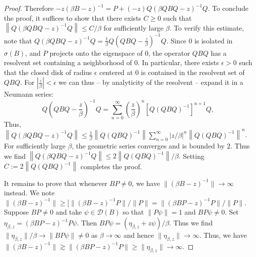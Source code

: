 \documentclass[10pt,a4paper]{amsart}
\begin{document}
\begin{proof}
	Therefore
	$
	-z (\beta B - z)^{-1} = P + (-z) Q (\beta Q B Q - z)^{-1} Q.
	$	
	To conclude the proof, it suffices to show that there exists $C \geq 0$ such that
	$
	\left\| Q (\beta Q B Q - z)^{-1} Q \right\| \leq C/\beta
	$
	for sufficiently large $\beta$.
	To verify this estimate, note that
	$
	Q (\beta Q B Q - z)^{-1} Q = \frac{1}{\beta} Q \left( Q B Q - \frac{z}{\beta} \right)^{-1} Q.
	$
	Since $0$ is isolated in $\sigma(B)$, and $P$ projects onto the eigenspace of $0$, the operator $Q B Q$ has a resolvent set containing a neighborhood of $0$. In particular, there exists $\epsilon > 0$ such that the closed disk of radius $\epsilon$ centered at $0$ is contained in the resolvent set of $Q B Q$.
	For $|\frac{z}{\beta}| < \epsilon$ we can thus -- by analyticity of the resolvent -- expand it in a Neumann series:
	\[
	Q \left( Q B Q - \frac{z}{\beta} \right)^{-1} Q = \sum_{n=0}^\infty \left( \frac{z}{\beta} \right)^n \left[ Q \left( Q B Q \right)^{-1} \right]^{n+1} Q,
	\]
	Thus,
		$
		\left\| Q (\beta Q B Q - z)^{-1} Q \right\| 
		\leq \frac{1}{\beta} \left\| Q (Q B Q)^{-1} \right\| \sum_{n=0}^\infty \left| z/\beta \right|^n \left\| Q (Q B Q)^{-1} \right\|^n$.
	For sufficiently large $\beta$, the geometric series converges and is bounded by $2$.
	Thus we find
	$
	\left\| Q (\beta Q B Q - z)^{-1} Q \right\| \leq 2 \left\| Q (Q B Q)^{-1} \right\|/\beta.
	$
	Setting
	$
	C := 2 \left\| Q (Q B Q)^{-1} \right\|
	$
	completes the proof.
	
	
	
	It remains to prove that whenever $B P \neq 0$, we have $\|(\beta B - z)^{-1} \| \rightarrow \infty$ instead. We note $\|(\beta B - z)^{-1} \| \geq [ \|(\beta B - z)^{-1}P \| /\|P\|= \|(\beta BP - z)^{-1}P \|/\|P\| $. Suppose $BP \neq 0$ and take $\psi \in \mathcal{D}(B)$ so that $\|P\psi\| = 1$ and $BP\psi \neq 0$. Set $\eta_{\beta,z} = (\beta BP -z)^{-1} P\psi$. Then $B P\psi = (\eta_{\beta,z} + z \psi)/\beta$. Thus we find $\|\eta_{\beta,z} \|/\beta \rightarrow  \|B P\psi\| \neq 0$ as $\beta \rightarrow \infty$ and hence $\|\eta_{\beta,z}\| \rightarrow \infty$. Thus, we have $\|(\beta B - z)^{-1} \| \gtrsim \|(\beta BP - z)^{-1}P \| \geq \|\eta_{\beta,z}\| \rightarrow \infty$.
	
\end{proof}
\end{document}

